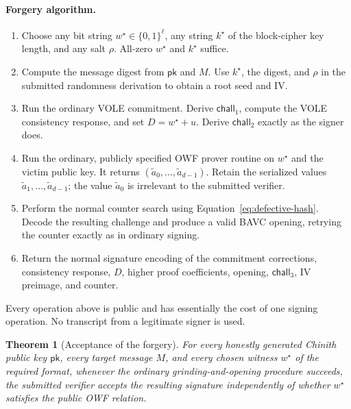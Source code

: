 \documentclass[11pt,a4paper]{article}
\newtheorem{theorem}{Theorem}
\newcommand{\pk}{\mathsf{pk}}
\begin{document}
\paragraph{Forgery algorithm.}
\begin{enumerate}[leftmargin=1.7em]
  \item Choose any bit string $w^{\star}\in\{0,1\}^{\ell}$, any string
        $k^{\star}$ of the block-cipher key length, and any salt $\rho$.
        All-zero $w^{\star}$ and $k^{\star}$ suffice.
  \item Compute the message digest from $\pk$ and $M$.  Use $k^{\star}$, the
        digest, and $\rho$ in the submitted randomness derivation to obtain a
        root seed and IV.
  \item Run the ordinary VOLE commitment.  Derive $\mathsf{chall}_1$, compute
        the VOLE consistency response, and set
        $D=w^{\star}+u$.  Derive $\mathsf{chall}_2$ exactly as the signer does.
  \item Run the ordinary, publicly specified OWF prover routine on $w^{\star}$ and the victim public key.
        It returns
        $(\widetilde a_0,\ldots,\widetilde a_{d-1})$.  Retain the serialized
        values $\widetilde a_1,\ldots,\widetilde a_{d-1}$; the value
        $\widetilde a_0$ is irrelevant to the submitted verifier.
  \item Perform the normal counter search using
        Equation~\eqref{eq:defective-hash}.  Decode the resulting challenge
        and produce a valid BAVC opening, retrying the counter exactly as in
        ordinary signing.
  \item Return the normal signature encoding of the commitment corrections,
        consistency response, $D$, higher proof coefficients, opening,
        $\mathsf{chall}_3$, IV preimage, and counter.
\end{enumerate}

Every operation above is public and has essentially the cost of one signing
operation.  No transcript from a legitimate signer is used.

\begin{theorem}[Acceptance of the forgery]
For every honestly generated Chinith public key $\pk$, every target message
$M$, and every chosen witness $w^{\star}$ of the required format, whenever
the ordinary grinding-and-opening procedure succeeds, the submitted verifier
accepts the resulting signature independently of whether $w^{\star}$ satisfies
the public OWF relation.
\end{theorem}
\end{document}
